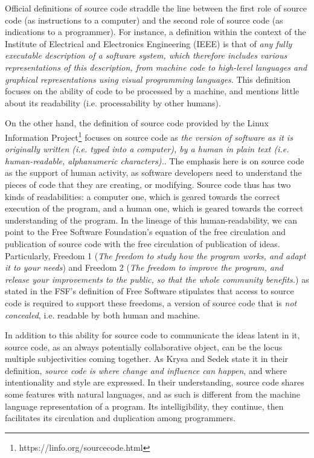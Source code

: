 Official definitions of source code straddle the line between the first role of source code (as instructions to a computer) and the second role of source code (as indications to a programmer). For instance, a definition within the context of the Institute of Electrical and Electronics Engineering (IEEE) is that of \emph{any fully executable description of a software system, which therefore includes various representations of this description, from machine code to high-level languages and graphical representations using visual programming languages}\cite{harman_why_2010}. This definition focuses on the ability of code to be processed by a machine, and mentions little about its readability (i.e. processability by other humans).

On the other hand, the definition of source code provided by the Linux Information Project\footnote{https://linfo.org/sourcecode.html} focuses on source code as \emph{the version of software as it is originally written (i.e. typed into a computer), by a human in plain text (i.e. human-readable, alphanumeric characters).}\cite{noauthor_source_nodate}. The emphasis here is on source code as the support of human activity, as software developers need to understand the pieces of code that they are creating, or modifying. Source code thus has two kinds of readabilities: a computer one, which is geared towards the correct execution of the program, and a human one, which is geared towards the correct understanding of the program. In the lineage of this human-readability, we can point to the Free Software Foundation's equation of the free circulation and publication of source code with the free circulation of publication of ideas. Particularly, Freedom 1 (\emph{The freedom to study how the program works, and adapt it to your needs}) and Freedom 2 (\emph{The freedom to improve the program, and release your improvements to the public, so that the whole community benefits.}\cite{stallman_free_2002}) as stated in the FSF's definition of Free Software stipulates that access to source code is required to support these freedoms, a version of source code that is \emph{not concealed}, i.e. readable by both human and machine.

In addition to this ability for source code to communicate the ideas latent in it, source code, as an always potentially collaborative object, can be the locus multiple subjectivities coming together. As Krysa and Sedek state it in their definition, \emph{source code is where change and influence can happen}, and where intentionality and style are expressed\cite{fuller_software_2008}. In their understanding, source code shares some features with natural languages, and as such is different from the machine language representation of a program. Its intelligibility, they continue, then facilitates its circulation and duplication among programmers.

